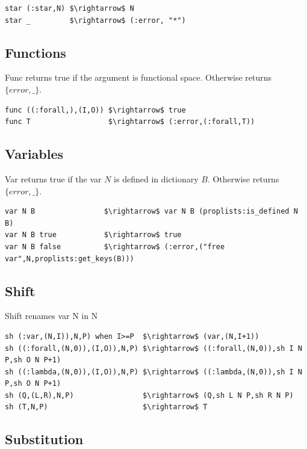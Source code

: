 \documentclass[11pt,oneside]{article}
\begin{document}
\begin{lstlisting}[mathescape=true]
star (:star,N) $\rightarrow$ N
star _         $\rightarrow$ (:error, "*")
\end{lstlisting}

\subsection{Functions}
Func returns true if the argument is functional space. Otherwise returns $\{error,\_\}$.

\begin{lstlisting}[mathescape=true]
func ((:forall,),(I,O)) $\rightarrow$ true
func T                  $\rightarrow$ (:error,(:forall,T))
\end{lstlisting}

\subsection{Variables}
Var returns true if the var $N$ is defined in dictionary $B$. Otherwise returns $\{error,\_\}$.

\begin{lstlisting}[mathescape=true]
var N B                $\rightarrow$ var N B (proplists:is_defined N B)
var N B true           $\rightarrow$ true
var N B false          $\rightarrow$ (:error,("free var",N,proplists:get_keys(B)))
\end{lstlisting}

\subsection{Shift}
Shift renames var N in N

\begin{lstlisting}[mathescape=true]
sh (:var,(N,I)),N,P) when I>=P  $\rightarrow$ (var,(N,I+1))
sh ((:forall,(N,0)),(I,O)),N,P) $\rightarrow$ ((:forall,(N,0)),sh I N P,sh O N P+1)
sh ((:lambda,(N,0)),(I,O)),N,P) $\rightarrow$ ((:lambda,(N,0)),sh I N P,sh O N P+1)
sh (Q,(L,R),N,P)                $\rightarrow$ (Q,sh L N P,sh R N P)
sh (T,N,P)                      $\rightarrow$ T
\end{lstlisting}

\subsection{Substitution}
\end{document}
